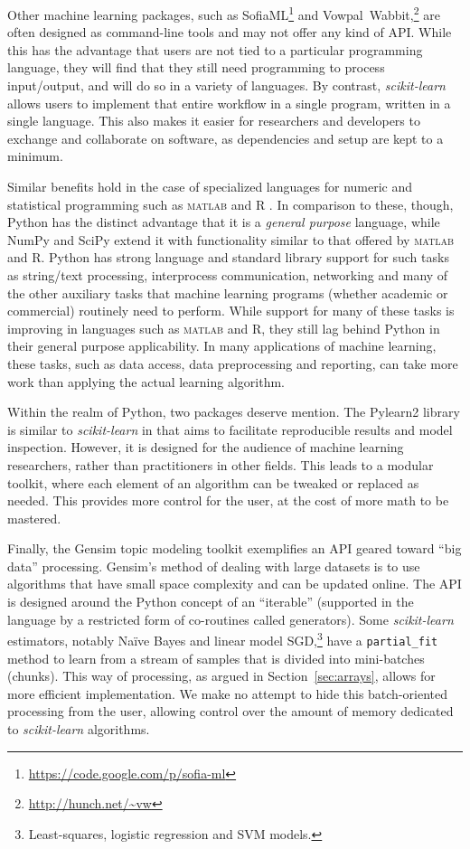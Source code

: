 \documentclass[twocolumn]{article}
\newcommand{\sklearn}{\textit{scikit-learn}\xspace}
\begin{document}
Other machine learning packages,
such as SofiaML\footnote{\url{https://code.google.com/p/sofia-ml}}
and Vowpal~Wabbit,\footnote{\url{http://hunch.net/~vw}}
are often designed as command-line tools
and may not offer any kind of API\@.
While this has the advantage that users are not tied
to a particular programming language,
they will find that they still need programming to process input/output,
and will do so in a variety of languages.
By contrast, \sklearn allows users to implement that entire workflow
in a single program, written in a single language.
This also makes it easier for researchers and developers
to exchange and collaborate on software, as dependencies and setup are kept to a
minimum.

Similar benefits hold in the case of specialized languages
for numeric and statistical programming
such as \textsc{matlab} and R \citep{r}.
In comparison to these, though, Python has the distinct advantage
that it is a \textit{general purpose} language,
while NumPy and SciPy extend it with functionality
similar to that offered by \textsc{matlab} and R.
Python has strong language and standard library support for such tasks as
string/text processing, interprocess communication, networking
and many of the other auxiliary tasks that machine learning programs
(whether academic or commercial) routinely need to perform.
While support for many of these tasks is improving in languages such as
\textsc{matlab} and R, they still lag behind Python in their general purpose
applicability.
In many applications of machine learning, these tasks, such as data access,
data preprocessing and reporting, can take more work than applying
the actual learning algorithm.

Within the realm of Python, two packages deserve mention.
The Pylearn2 library \citep{goodfellow2013pylearn2}
is similar to \sklearn in that aims to facilitate reproducible results
and model inspection.
However, it is designed for the audience of machine learning researchers,
rather than practitioners in other fields.
This leads to a modular toolkit,
where each element of an algorithm can be tweaked or replaced as needed.
This provides more control for the user,
at the cost of more math to be mastered.

Finally, the Gensim topic modeling toolkit \citep{rehurek2010gensim}
exemplifies an API geared toward ``big data'' processing.
Gensim's method of dealing with large datasets is to use algorithms
that have small space complexity and can be updated online.
The API is designed around the Python concept of an ``iterable''
(supported in the language by a restricted form of co-routines called generators).
Some \sklearn estimators, notably Naïve Bayes and linear model SGD,\footnote{
  Least-squares, logistic regression and SVM models.}
have a \texttt{partial\_fit} method to learn from a stream of samples
that is divided into mini-batches (chunks).
This way of processing, as argued in Section~\ref{sec:arrays},
allows for more efficient implementation.
We make no attempt to hide this batch-oriented processing from the user,
allowing control over the amount of memory dedicated to \sklearn algorithms.
\end{document}
